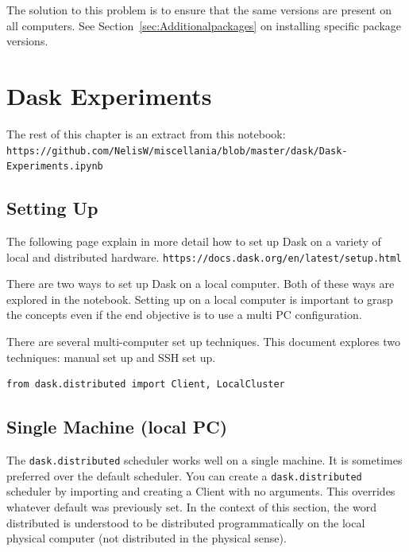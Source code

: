 The solution to this problem is to ensure that the same versions are present on all computers.
See Section~\ref{sec:Additionalpackages} on installing specific package versions.




\section{Dask Experiments}
\label{sec:DaskExperiments}

The rest of this chapter is an extract from this notebook:\\
\lstinline{https://github.com/NelisW/miscellania/blob/master/dask/Dask-Experiments.ipynb}


\subsection{Setting Up}
\label{sec:SettingUp}

The following page explain in more detail how to set up Dask on a variety of local and distributed hardware.
\lstinline{https://docs.dask.org/en/latest/setup.html}


There are two ways to set up Dask on a local computer. Both of these ways are explored in the notebook.
Setting up on a local computer is important to grasp the concepts even if the end objective is to use a multi PC configuration.


There are several multi-computer set up techniques. This document explores two techniques: manual set up and SSH set up.



\begin{lstlisting}[style=incellstyle]
from dask.distributed import Client, LocalCluster

\end{lstlisting}


\subsection{Single Machine (local PC)}
\label{sec:SingleMachinelocalPC}

The \verb+dask.distributed+ scheduler works well on a single machine. It is sometimes preferred over the default scheduler. 
You can create a \verb+dask.distributed+ scheduler by importing and creating a Client with no arguments. This overrides whatever default was previously set.  In the context of this section, the word distributed is understood to be distributed programmatically on the local physical computer (not distributed in the physical sense).


